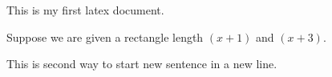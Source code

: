 \documentclass[11pt]{article}
\begin{document}
This is my first latex document.

Suppose we are given a rectangle
length $(x+1)$ and $(x+3)$.

This is second way to start new sentence in a new line.\\
\end{document}
